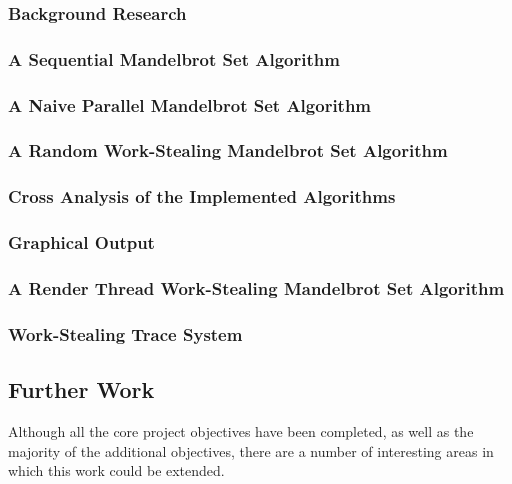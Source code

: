 \subsubsection*{Background Research}
\subsubsection*{A Sequential Mandelbrot Set Algorithm}
\subsubsection*{A Naive Parallel Mandelbrot Set Algorithm}
\subsubsection*{A Random Work-Stealing Mandelbrot Set Algorithm}
\subsubsection*{Cross Analysis of the Implemented Algorithms}
\subsubsection*{Graphical Output}
\subsubsection*{A Render Thread Work-Stealing Mandelbrot Set Algorithm}
\subsubsection*{Work-Stealing Trace System}


\subsection{Further Work}

Although all the core project objectives have been completed, as well as the majority of the additional objectives, 
there are a number of interesting areas in which this work could be extended.

